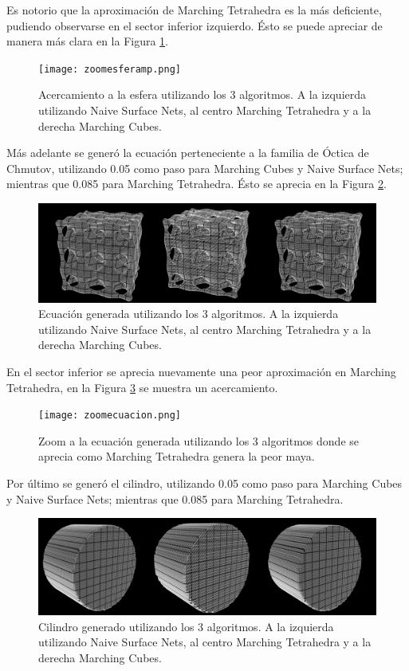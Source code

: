 \documentclass[12pt]{article}
\begin{document}
Es notorio que la aproximación de Marching Tetrahedra es la más deficiente, pudiendo observarse en el sector inferior izquierdo. Ésto se puede apreciar de manera más clara en la Figura \ref{sinNombre}.

\begin{figure}[h!]
\texttt{[image: zoomesferamp.png]}
\caption{Acercamiento a la esfera utilizando los 3 algoritmos.  A la izquierda utilizando Naive Surface Nets, al centro Marching Tetrahedra y a la derecha Marching Cubes.}
\label{sinNombre}
\end{figure}

Más adelante se generó la ecuación perteneciente a la familia de Óctica de Chmutov, utilizando 0.05 como paso para Marching Cubes y Naive Surface Nets; mientras que 0.085 para Marching Tetrahedra. Ésto se aprecia en la Figura \ref{ecuacion22G}.

\begin{figure}[h!]
\includegraphics[width=\linewidth,center]{ecuacion2.png}
\caption{Ecuación generada utilizando los 3 algoritmos.  A la izquierda utilizando Naive Surface Nets, al centro Marching Tetrahedra y a la derecha Marching Cubes.}
\label{ecuacion22G}
\end{figure}

En el sector inferior se aprecia nuevamente una peor aproximación en Marching Tetrahedra, en la Figura \ref{ecuacion22GZ} se muestra un acercamiento.

\begin{figure}[h!]
\texttt{[image: zoomecuacion.png]}
\caption{Zoom a la ecuación generada utilizando los 3 algoritmos donde se aprecia como Marching Tetrahedra genera la peor maya.}
\label{ecuacion22GZ}
\end{figure}

Por último se generó el cilindro, utilizando 0.05 como paso para Marching Cubes y Naive Surface Nets; mientras que 0.085 para Marching Tetrahedra.

\begin{figure}[h!]
\includegraphics[width=\linewidth,center]{cilindro2.png}
\caption{Cilindro generado utilizando los 3 algoritmos.  A la izquierda utilizando Naive Surface Nets, al centro Marching Tetrahedra y a la derecha Marching Cubes.}
  \label{cilindro2G}
\end{figure}
\end{document}

